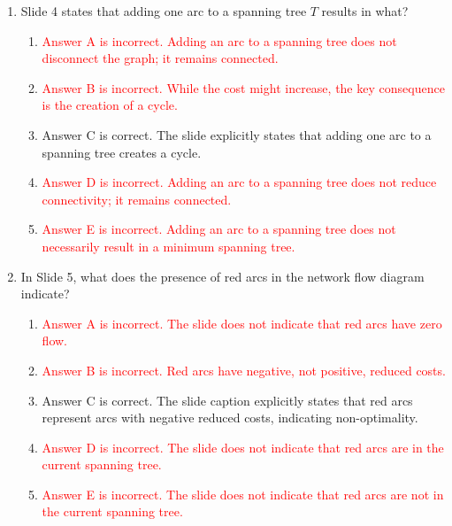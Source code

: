 \documentclass{article}%
\newcommand{\incorrect}[1]{\textcolor{red}{#1}}
\begin{document}
\begin{enumerate}
\begin{enumerate}
\item \incorrect{Answer D is incorrect. This equation does not correctly represent the relationship between the dual variables, reduced costs, and arc costs.}%
\item \incorrect{Answer E is incorrect. This equation does not correctly represent the relationship between the dual variables, reduced costs, and arc costs.}%
\end{enumerate}%
\vspace{1em}%
\item Slide 4 states that adding one arc to a spanning tree $T$ results in what?%
\begin{enumerate}%
\item \incorrect{Answer A is incorrect. Adding an arc to a spanning tree does not disconnect the graph; it remains connected.}%
\item \incorrect{Answer B is incorrect. While the cost might increase, the key consequence is the creation of a cycle.}%
\item Answer C is correct. The slide explicitly states that adding one arc to a spanning tree creates a cycle.%
\item \incorrect{Answer D is incorrect. Adding an arc to a spanning tree does not reduce connectivity; it remains connected.}%
\item \incorrect{Answer E is incorrect.  Adding an arc to a spanning tree does not necessarily result in a minimum spanning tree.}%
\end{enumerate}%
\vspace{1em}%
\item In Slide 5, what does the presence of red arcs in the network flow diagram indicate?%
\begin{enumerate}%
\item \incorrect{Answer A is incorrect. The slide does not indicate that red arcs have zero flow.}%
\item \incorrect{Answer B is incorrect. Red arcs have negative, not positive, reduced costs.}%
\item Answer C is correct. The slide caption explicitly states that red arcs represent arcs with negative reduced costs, indicating non-optimality.%
\item \incorrect{Answer D is incorrect. The slide does not indicate that red arcs are in the current spanning tree.}%
\item \incorrect{Answer E is incorrect. The slide does not indicate that red arcs are not in the current spanning tree.}%
\end{enumerate}%

\end{enumerate}
\end{document}
